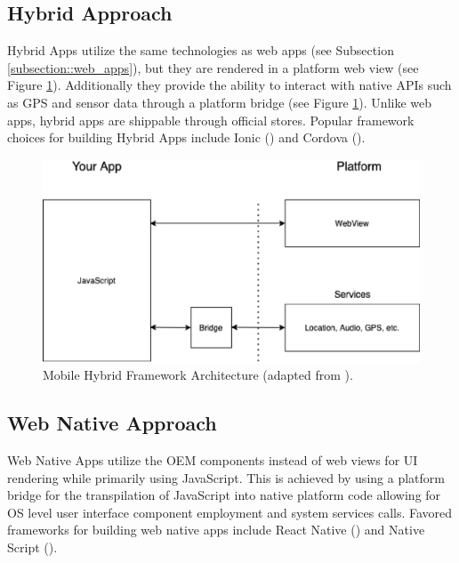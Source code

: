 \subsection{Hybrid Approach}
Hybrid Apps utilize the same technologies as web apps (see Subsection \ref{subsection::web_apps}), but they are rendered in a platform web view (see Figure \ref{fig:hybrid_architecture}). Additionally they provide the ability to 
interact with native APIs such as GPS and sensor data through a platform bridge (see Figure \ref{fig:hybrid_architecture}).
Unlike web apps, hybrid apps are shippable through official stores.
Popular framework choices for building Hybrid Apps include Ionic (\cite{Ionic2021}) and Cordova (\cite{Cordova2020}).

\begin{figure}
    \centering
    \includegraphics[width=.8\linewidth]{images/architectures/hybrid_architecture.eps}
    \caption{Mobile Hybrid Framework Architecture (adapted from \cite{Cunha2018}).}
    \label{fig:hybrid_architecture}
\end{figure}

\subsection{Web Native Approach} \label{subsection::web_native_apps}
Web Native Apps utilize the OEM components instead of web views for UI rendering while primarily using JavaScript.
This is achieved by using a platform bridge for the transpilation of JavaScript into native platform code allowing for OS level user interface component employment
and system services calls. 
Favored frameworks for building web native apps include React Native (\cite{ReactNative2021}) and Native Script (\cite{NativeScript2021}).

